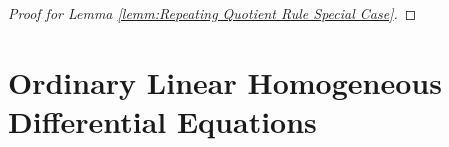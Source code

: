 \begin{proof}[Proof for Lemma \ref{lemm:Repeating Quotient Rule Special Case}]
	
	
\unfinished
\end{proof}
	













































\section{Ordinary Linear Homogeneous Differential Equations}


